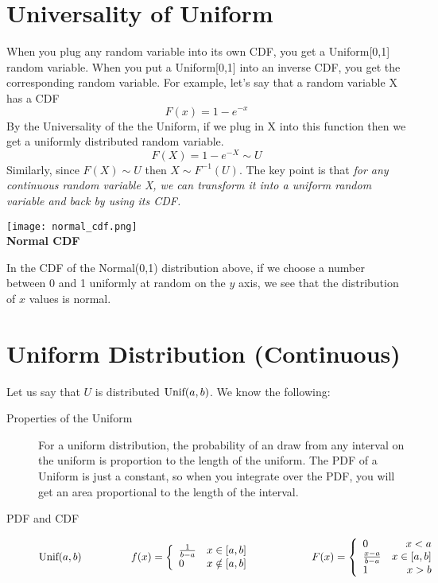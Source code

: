 \documentclass[11.5pt]{article}
\begin{document}
\begin{notes}
\section*{Universality of Uniform} When you plug any random variable into its own CDF, you get a Uniform[0,1] random variable. When you put a Uniform[0,1] into an inverse CDF, you get the corresponding random variable. For example, let's say that a random variable X has a CDF
	\[ F(x) = 1 - e^{-x} \]
	By the Universality of the the Uniform, if we plug in X into this function then we get a uniformly distributed random variable.
	\[ F(X) = 1 - e^{-X} \sim U\]
	Similarly, since $F(X) \sim U$ then $X \sim F^{-1}(U)$. The key point is that \emph{for any continuous random variable X, we can transform it into a uniform random variable and back by using its CDF.}
\begin{center} 
\texttt{[image: normal\_cdf.png]}\\
\textbf{Normal CDF}
\end{center}
In the CDF of the Normal(0,1) distribution above, if we choose a number between 0 and 1 uniformly at random on the $y$ axis, we see that the distribution of $x$ values is normal. 
\section*{Uniform Distribution (Continuous)}
\begin{description}
\item Let us say that $U$ is distributed $\textrm{Unif}(a, b)$. We know the following:
\begin{description}
	\item[Properties of the Uniform] For a uniform distribution, the probability of an draw from any interval on the uniform is proportion to the length of the uniform. The PDF of a Uniform is just a constant, so when you integrate over the PDF, you will get an area proportional to the length of the interval.
	\item[PDF and CDF] 
\begin{eqnarray*}
\textrm{Unif}(a, b)
  \hspace{.65 in}
   f(x) = \left\{
     \begin{array}{lr}
       \frac{1}{b-a} & x \in [a, b] \\
       0 &  x \notin [a, b]
     \end{array}
   \right.
   \hspace{.75 in}
   F(x) = \left\{
     \begin{array}{lr}
       0 & x < a \\
       \frac{x-a}{b-a} & x \in [a, b] \\
       1 &  x > b
     \end{array}
   \right. 
\end{eqnarray*}



\end{description}
\end{description}
\end{notes}
\end{document}
